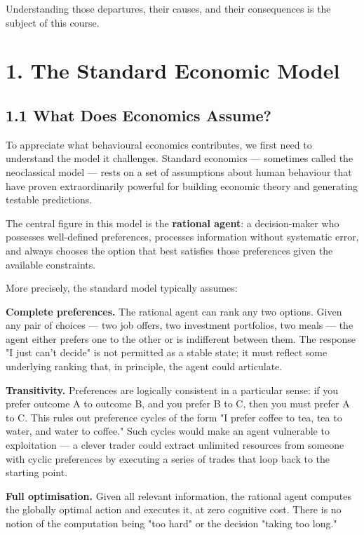 \documentclass[12pt, letterpaper]{article}
\begin{document}
Understanding those departures, their causes, and their consequences is the subject of this course.

\medskip


\section{1. The Standard Economic Model}



\subsection{1.1 What Does Economics Assume?}


To appreciate what behavioural economics contributes, we first need to understand the model it challenges. Standard economics --- sometimes called the neoclassical model --- rests on a set of assumptions about human behaviour that have proven extraordinarily powerful for building economic theory and generating testable predictions.

The central figure in this model is the \textbf{rational agent}: a decision-maker who possesses well-defined preferences, processes information without systematic error, and always chooses the option that best satisfies those preferences given the available constraints.

More precisely, the standard model typically assumes:

\textbf{Complete preferences.} The rational agent can rank any two options. Given any pair of choices --- two job offers, two investment portfolios, two meals --- the agent either prefers one to the other or is indifferent between them. The response "I just can't decide" is not permitted as a stable state; it must reflect some underlying ranking that, in principle, the agent could articulate.

\textbf{Transitivity.} Preferences are logically consistent in a particular sense: if you prefer outcome A to outcome B, and you prefer B to C, then you must prefer A to C. This rules out preference cycles of the form "I prefer coffee to tea, tea to water, and water to coffee." Such cycles would make an agent vulnerable to exploitation --- a clever trader could extract unlimited resources from someone with cyclic preferences by executing a series of trades that loop back to the starting point.

\textbf{Full optimisation.} Given all relevant information, the rational agent computes the globally optimal action and executes it, at zero cognitive cost. There is no notion of the computation being "too hard" or the decision "taking too long."
\end{document}
